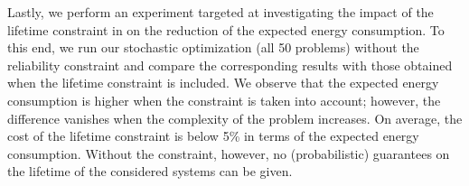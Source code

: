 Lastly, we perform an experiment targeted at investigating the impact of the
lifetime constraint in  on the reduction of
the expected energy consumption. To this end, we run our stochastic optimization
(all 50 problems) without the reliability constraint and compare the
corresponding results with those obtained when the lifetime constraint is
included. We observe that the expected energy consumption is higher when the
constraint is taken into account; however, the difference vanishes when the
complexity of the problem increases. On average, the cost of the lifetime
constraint is below 5\% in terms of the expected energy consumption. Without the
constraint, however, no (probabilistic) guarantees on the lifetime of the
considered systems can be given.
